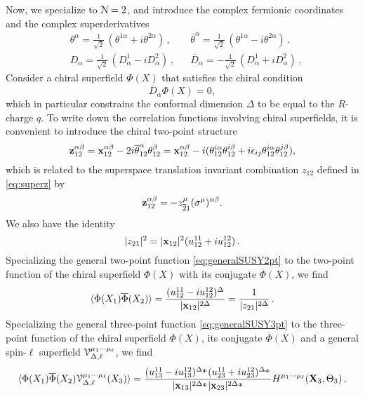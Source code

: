 \documentclass[11pt]{article}
\begin{document}
Now, we specialize to ${\cal N}=2$, and introduce the complex fermionic coordinates and the complex superderivatives
%
\begin{align}
&\theta^\alpha=\frac{1}{\sqrt{2}} \, (\theta^{1\alpha}+i\theta^{2\alpha})\,,&& \bar \theta^\alpha=\frac{1}{\sqrt{2}} \, (\theta^{1\alpha}-i\theta^{2\alpha})\,.
\\
&D_\alpha = \frac{1}{\sqrt{2}} \, (D^1_\alpha-iD^2_\alpha)\,,&& \overline D_\alpha = -\frac{1}{\sqrt{2}} \, (D^1_\alpha+iD^2_\alpha)\,,
\end{align}
%
Consider a chiral superfield $\Phi(X)$ that satisfies the chiral condition
%
\begin{equation}
\overline D_\alpha \Phi(X)=0,
\end{equation}
%
which in particular constrains the conformal dimension $\Delta$ to be equal to the $R$-charge $q$.
To write down the correlation functions involving chiral superfields, it is convenient to introduce the chiral two-point structure
%
\begin{equation}
{\bf z}_{12}^{\alpha\beta}={\bf x}_{12}^{\alpha\beta}-2i\overline{\theta}^\alpha_{12}{\theta}_{12}^\beta={\bf x}^{\alpha\beta}_{12}-i(\theta_{12}^{i\alpha}\theta_{12}^{i\beta}+i\epsilon_{ij}\theta_{12}^{i\alpha}\theta_{12}^{j\beta}),
\end{equation}
%
which is related to the superspace translation invariant combination $z_{ 12}$ defined in \eqref{eq:superz} by 
%
\begin{equation}
{\bf z}_{1 2}^{\alpha\beta} = - z_{ \overline 2 1}^\mu(\sigma^\mu)^{\alpha\beta}.
\end{equation}
%
We also have the identity
%
\begin{equation}
|z_{21}|^2 = |{\bf x}_{12}|^2(u_{12}^{11}+iu_{12}^{12})\,.
\end{equation}
%
Specializing the general two-point function \eqref{eq:generalSUSY2pt} to the two-point function of the chiral superfield $\Phi(X)$ with its conjugate $\overline\Phi(X)$, we find
%
\begin{equation}
\langle \Phi(X_1) \overline\Phi(X_2)\rangle = \frac{ (u_{12}^{11}-i u_{12}^{12})^{\Delta} }{ |{\bf x}_{12}|^{2\Delta}}= \frac{1}{ |z_{2 1}|^{2\Delta}}\,.
\end{equation}
%
Specializing the general three-point function \eqref{eq:generalSUSY3pt} to the three-point function of the chiral superfield $\Phi(X)$, its conjugate $\overline\Phi(X)$ and a general spin-$\ell$ superfield ${\cal V}_{\Delta,\ell}^{\mu_1\cdots \mu_\ell}$, we find
%
\begin{equation}\label{eq:chiralSUSY3ptA}
\langle \Phi(X_1) \overline \Phi(X_2)  {\cal V}_{\Delta,\ell}^{\mu_1\cdots \mu_\ell}(X_3)\rangle = 
\frac{(u_{13}^{11}-i u_{13}^{12})^{\Delta_\Phi} (u_{23}^{11}+i u_{23}^{12})^{\Delta_\Phi} }{ |{\bf x}_{13}|^{2\Delta_\Phi}  |{\bf x}_{23}|^{2\Delta_\Phi} }H^{\mu_1\cdots\mu_\ell}({\bf X}_3,\Theta_3)\,,
\end{equation}
\end{document}
